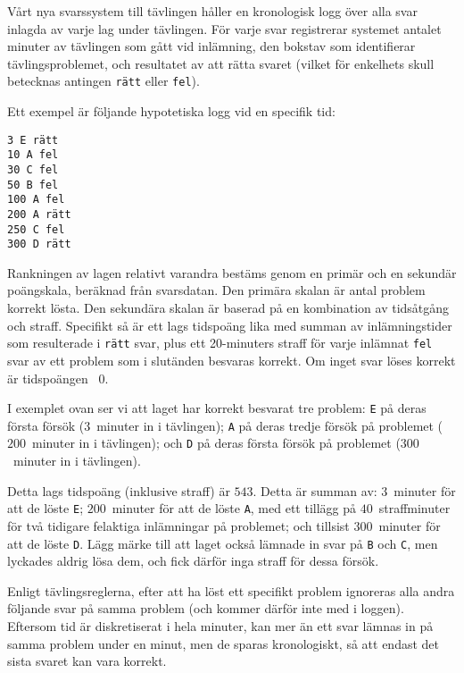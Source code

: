 
Vårt nya svarssystem till tävlingen håller en kronologisk logg
över alla svar inlagda av varje lag under tävlingen. För varje
svar registrerar systemet antalet minuter av tävlingen som gått vid
inlämning, den bokstav som identifierar tävlingsproblemet, och
resultatet av att rätta svaret (vilket för enkelhets skull betecknas
antingen {\tt rätt} eller {\tt fel}).

Ett exempel är följande hypotetiska logg vid en specifik tid:

\vspace{-12pt}
\begin{verbatim}
3 E rätt
10 A fel
30 C fel
50 B fel
100 A fel
200 A rätt
250 C fel
300 D rätt
\end{verbatim}
\vspace{-12pt}

Rankningen av lagen relativt varandra bestäms genom en primär och 
en sekundär poängskala, beräknad från svarsdatan. Den primära skalan
är antal problem korrekt lösta. Den sekundära skalan är baserad på en kombination
av tidsåtgång och straff. Specifikt så är ett lags tidspoäng lika med
summan av inlämningstider som resulterade i {\tt rätt} svar, plus
ett 20-minuters straff för varje inlämnat {\tt fel} svar av ett problem som
i slutänden besvaras korrekt. Om inget svar löses korrekt är tidspoängen
~$0$.

I exemplet ovan ser vi att laget har korrekt besvarat tre problem:
{\tt E} på deras första försök ($3$~minuter in i tävlingen);
{\tt A} på deras tredje försök på problemet ($200$~minuter in i
tävlingen); och {\tt D} på deras första försök på problemet
($300$~minuter in i tävlingen).

Detta lags tidspoäng (inklusive straff) är $543$. Detta är
summan av: $3$~minuter för att de löste {\tt E}; $200$~minuter för
att de löste {\tt A}, med ett tillägg på $40$~straffminuter för
två tidigare felaktiga inlämningar på problemet; och tillsist
$300$~minuter för att de löste {\tt D}.
%
Lägg märke till att laget också lämnade in svar på {\tt B} och
{\tt C}, men lyckades aldrig lösa dem, och fick därför inga
straff för dessa försök.

Enligt tävlingsreglerna, efter att ha löst ett specifikt problem
ignoreras alla andra följande svar på samma problem (och kommer
därför inte med i loggen). Eftersom tid är diskretiserat i hela minuter,
kan mer än ett svar lämnas in på samma problem under en minut, men
de sparas kronologiskt, så att endast det sista svaret kan vara korrekt.

